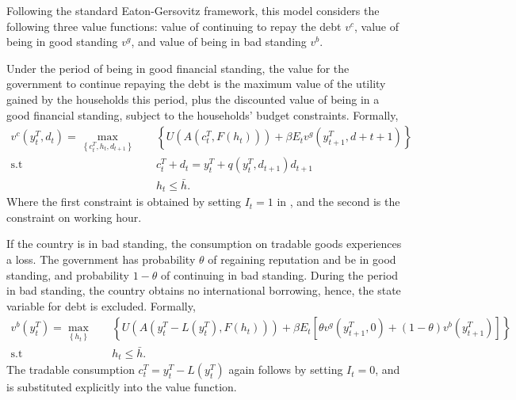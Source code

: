 Following the standard Eaton-Gersovitz framework, this model considers the following three value functions:
value of continuing to repay the debt $v^c$, value of being in good standing $v^g$, and value of being in bad standing $v^b$.

Under the period of being in good financial standing, the value for the government to continue repaying the debt is the maximum value of the utility gained by the households this period, plus the discounted value of being in a good financial standing, subject to the households' budget constraints. Formally,
\begin{equation}
    \begin{aligned}
        v^c(y^T_t, d_t) = \max_{\left\{ c^T_t, h_t, d_{t+1} \right\}} \quad
        &\left\{
            U\left(
                A\left(c^T_t, F(h_t)\right)
             \right)
             + \beta E_t
             v^g \left(
                y^T_{t+1}, d+{t+1}
              \right)
         \right\}\\
          \text{s.t} \quad& c^T_t + d_t = y^T_t + q(y^T_t, d_{t+1}) d_{t+1} \\
                    & h_t \le \bar{h}.
    \end{aligned}
\end{equation}
Where the first constraint is obtained by setting $I_t = 1$ in , and the second is the constraint on working hour.

If the country is in bad standing, the consumption on tradable goods experiences a loss. The government has probability $\theta$ of regaining reputation and be in good standing, and probability $1 - \theta$ of continuing in bad standing. During the period in bad standing, the country obtains no international borrowing, hence, the state variable for debt is excluded. Formally,
\begin{equation}
    \begin{aligned}
        v^b(y^T_t) = \max_{\left\{ h_t \right\}} \quad
        &\left\{
            U\left(
                A\left( y^T_t - L(y^T_t), F(h_t)\right)
             \right)
             + \beta E_t \left[
                \theta v^g \left(
                    y^T_{t+1}, 0
                \right)
                + (1-\theta) v^b \left(
                    y^{T}_{t+1}
                 \right)
            \right]
         \right\}\\
          \text{s.t} \quad& h_t \le \bar{h}.
    \end{aligned}
\end{equation}
The tradable consumption $c^T_t = y^T_t - L(y^T_t)$ again follows  by setting $I_t = 0$, and is substituted explicitly into the value function.

